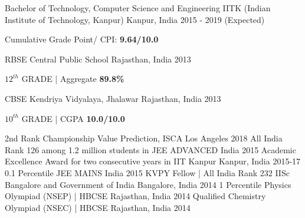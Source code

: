 \documentclass[12pt, a4paper]{awesome-cv}
\begin{document}
\makecvheader
\begin{cventries}
  \cventry
    {Bachelor of Technology, Computer Science and Engineering}
    {IITK (Indian Institute of Technology, Kanpur)}
    {Kanpur, India}
    {2015 - 2019 (Expected)}
    {
      \begin{cvitems}
        \item {Cumulative Grade Point/ CPI:\textbf{ 9.64/10.0} }
      \end{cvitems}
    }
    \vspace{0.2cm}
  \cventry
    {RBSE}
    {Central Public School}
    {Rajasthan, India}
    {2013}
    {
      \begin{cvitems}
        \item {$12 ^{th}$ GRADE | Aggregate \textbf{89.8\%}}      
      \end{cvitems} 
    }
    \vspace{0.2cm}
  \cventry
    {CBSE}
    {Kendriya Vidyalaya, Jhalawar}
    {Rajasthan, India}
    {2013}
    {
      \begin{cvitems}
        \item {$10 ^{th}$ GRADE | CGPA \textbf{10.0/10.0}}      
      \end{cvitems} 
    }

\end{cventries}
\vspace{-0.3cm}
\begin{cvhonors}
  \cvhonor
    {2nd Rank}
    {Championship Value Prediction, ISCA}
    {Los Angeles}
    {2018}
  \cvhonor
    {All India Rank 126}
    {among 1.2 million students in JEE ADVANCED}
    {India}
    {2015}
  \cvhonor
    {Academic Excellence Award}
    {for two consecutive years in IIT Kanpur}
    {Kanpur, India}
    {2015-17}
  \cvhonor
    {0.1 Percentile}
    {JEE MAINS}
    {India}
    {2015}
  \cvhonor
    {KVPY Fellow | All India Rank 232}
    {IISc Bangalore and Government of India}
    {Bangalore, India}
    {2014}
  \cvhonor
    {1 Percentile}
    {Physics Olympiad (NSEP) | HBCSE}    
    {Rajasthan, India}
    {2014}  
  \cvhonor
    {Qualified}
    {Chemistry Olympiad (NSEC) | HBCSE}
    {Rajasthan, India}
    {2014}

\end{cvhonors}
\end{document}
